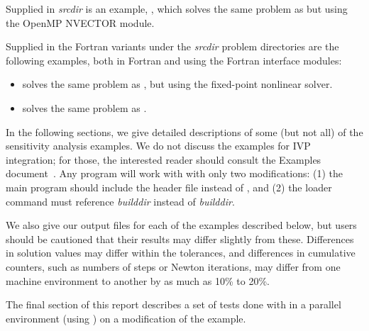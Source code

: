 
\vspace{0.2in}\noindent 
Supplied in {\em srcdir} is
an example, , which solves the same problem as
 but using the OpenMP NVECTOR module.


\vspace{0.2in}\noindent Supplied in the
Fortran variants under the {\em srcdir} problem directories are the
following examples, both in Fortran and using the {\sundials} Fortran
interface modules:
\begin{itemize}
\item {} solves the same problem as
  , but using the fixed-point nonlinear solver.
\item {} solves the same problem as
  .
\end{itemize}


\vspace{0.2in}\noindent
In the following sections, we give detailed descriptions of some (but
not all) of the sensitivity analysis examples. We do not discuss the 
examples for IVP integration; for those, the interested reader should consult
the {\cvode} Examples document~\cite{cvode_ex}. Any {\cvode} program
will work with {\cvodes} with only two modifications: (1) the main program
should include the header file  instead of , and
(2) the loader command must reference
{\em builddir} instead of
{\em builddir}.

We also give our output files for each of the examples described below, 
but users should be cautioned that their
results may differ slightly from these.  Differences in solution
values may differ within the tolerances, and differences in cumulative
counters, such as numbers of steps or Newton iterations, may differ
from one machine environment to another by as much as 10\% to 20\%.

The final section of this report describes a set of tests done with
{\cvodes} in a parallel environment (using {\nvecp}) on a modification of
the  example.

